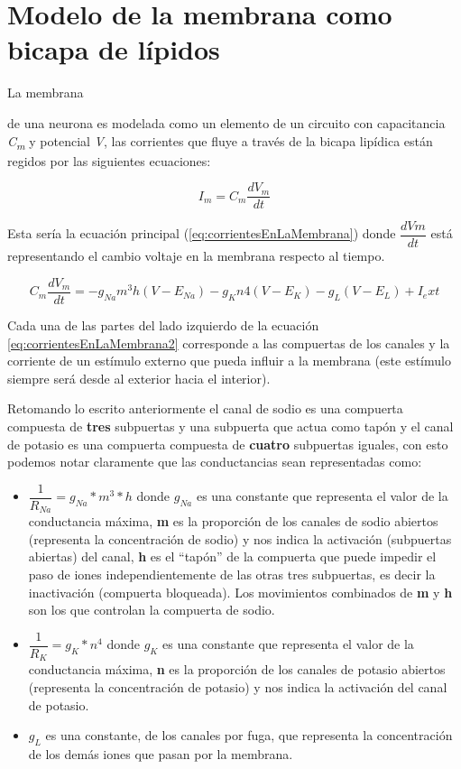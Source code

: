 \section{Modelo de la membrana como bicapa de lípidos}

\hypertarget{LaEq}{La membrana} de una neurona es modelada como un elemento de un circuito con capacitancia \emph{C\textsubscript{m}} y potencial \emph{V}, las corrientes que fluye a través de la bicapa lipídica están regidos por las siguientes ecuaciones:


\begin{equation}
  I_{m} = C_{m} \dfrac{dV_{m}}{dt}
  \label{eq:corrientesEnLaMembrana}
\end{equation}

Esta sería la ecuación principal (\ref{eq:corrientesEnLaMembrana}) donde \(\dfrac{dVm}{dt}\) está representando el cambio voltaje en la membrana respecto al tiempo.

\begin{equation}
  C_{m} \dfrac{dV_{m}}{dt} =  - g_{Na} m^3 h(V - E_{Na} ) - g_{K} n 4 (V - E_{K} ) - g_{L} (V - E_{L} ) + I_ext
  \label{eq:corrientesEnLaMembrana2}
\end{equation}

Cada una de las partes del lado izquierdo de la ecuación \ref{eq:corrientesEnLaMembrana2} corresponde a las compuertas de los canales y la corriente de un estímulo externo que pueda influir a la membrana (este estímulo siempre será desde al exterior hacia el interior).

Retomando lo escrito anteriormente el canal de sodio es una compuerta compuesta de \textbf{tres} subpuertas y una subpuerta que actua como tapón y el canal de potasio es una compuerta compuesta de \textbf{cuatro} subpuertas iguales, \hypertarget{secc} {con esto podemos notar claramente que las conductancias sean representadas como}:

\begin{itemize}
 \item \(\dfrac{1}{R_{Na}} = g_{Na} * m ^3 * h \) donde \(g_{Na}\) es una constante que representa el valor de la conductancia máxima, \textbf{m} es la proporción de los canales de sodio abiertos (representa la concentración de sodio) y nos indica la activación (subpuertas abiertas) del canal, \textbf{h} es el “tapón” de la compuerta que puede impedir el paso de iones independientemente de las otras tres subpuertas, es decir la inactivación (compuerta bloqueada).
Los movimientos combinados de \textbf{m} y \textbf{h} son los que controlan la compuerta de sodio.
 \item \(\dfrac{1}{R_{K}} = g_{K} * n^4\) donde \(g_{K}\) es una constante que representa el valor de la conductancia máxima, \textbf{n} es la proporción de los canales de potasio abiertos (representa la concentración de potasio) y nos indica la activación del canal de potasio.
 \item \(g_{L}\) es una constante, de los canales por fuga, que representa la concentración de los demás iones que pasan por la membrana.
\end{itemize}

